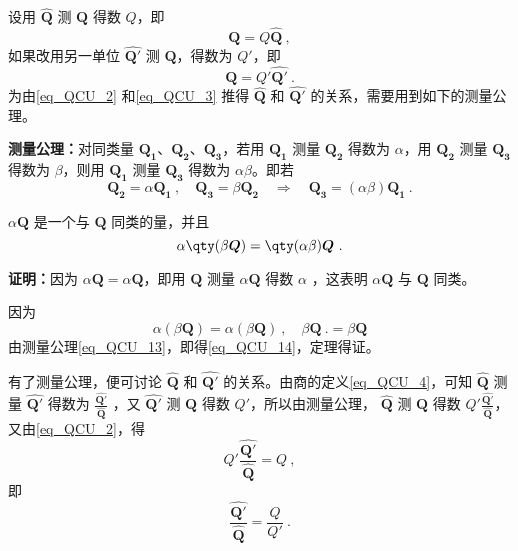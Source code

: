 设用 $\hat{\boldsymbol{Q}}$ 测 $\boldsymbol{Q}$ 得数 $Q$，即
\begin{equation}\label{eq_QCU_2}
\boldsymbol{Q}=Q\hat{\boldsymbol{Q}}~,
\end{equation}
如果改用另一单位 $\hat{\boldsymbol{Q'}}$ 测 $\boldsymbol{Q}$，得数为 $Q'$，即
\begin{equation}\label{eq_QCU_3}
\boldsymbol{Q}=Q'\hat{\boldsymbol{Q'}}~.
\end{equation}
为由\autoref{eq_QCU_2} 和\autoref{eq_QCU_3} 推得 $\hat{\boldsymbol{Q}}$ 和 $\hat{\boldsymbol{Q'}}$ 的关系，需要用到如下的测量公理。

\textbf{测量公理：}对同类量 $\boldsymbol{Q_1}$、$\boldsymbol{Q_2}$、$\boldsymbol{Q_3}$，若用 $\boldsymbol{Q_1}$ 测量 $\boldsymbol{Q_2}$ 得数为 $\alpha$，用 $\boldsymbol{Q_2}$ 测量 $\boldsymbol{Q_3}$ 得数为 $\beta$，则用 $\boldsymbol{Q_1}$ 测量 $\boldsymbol{Q_3}$ 得数为 $\alpha\beta$。即若
\begin{equation}\label{eq_QCU_13}
\boldsymbol{Q_2}=\alpha\boldsymbol{Q_1}~,\quad \boldsymbol{Q_3}=\beta\boldsymbol{Q_2}\quad\Rightarrow \quad\boldsymbol{Q_3}=(\alpha\beta)\boldsymbol{Q_1}~.
\end{equation}

\begin{theorem}{}\label{the_QCU_2}
$\alpha \boldsymbol{Q}$ 是一个与 $\boldsymbol{Q}$ 同类的量，并且
\begin{equation}\label{eq_QCU_14}
\alpha\qty(\beta \boldsymbol{Q})=\qty(\alpha\beta)\boldsymbol Q~.
\end{equation}
\end{theorem}
\textbf{证明：}因为 $\alpha\boldsymbol{Q}=\alpha\boldsymbol{Q}$，即用 $\boldsymbol{Q}$ 测量 $\alpha\boldsymbol{Q}$ 得数 $\alpha$ ，这表明 $\alpha\boldsymbol{Q}$ 与 $\boldsymbol{Q}$ 同类。

因为
\begin{equation}
\alpha(\beta\boldsymbol{Q})=\alpha(\beta\boldsymbol{Q})~,\quad \beta\boldsymbol{Q}~.=\beta\boldsymbol{Q}
\end{equation}
由测量公理\autoref{eq_QCU_13}，即得\autoref{eq_QCU_14}，定理得证。

有了测量公理，便可讨论 $\hat{\boldsymbol{Q}}$ 和 $\hat{\boldsymbol{Q'}}$ 的关系。由商的定义\autoref{eq_QCU_4}，可知 $\hat{\boldsymbol{Q}}$ 测量 $\hat{\boldsymbol{Q'}}$ 得数为 $\frac{\hat{\boldsymbol{Q'}}}{\hat{\boldsymbol{Q}}}$ ，又 $\hat{\boldsymbol{Q'}}$ 测 $\boldsymbol{Q}$ 得数 $Q'$，所以由测量公理， $\hat{\boldsymbol{Q}}$ 测 $\boldsymbol{Q}$ 得数 $Q'\frac{\hat{\boldsymbol{Q'}}}{\hat{\boldsymbol{Q}}}$，又由\autoref{eq_QCU_2}，得
\begin{equation}
Q'\frac{\hat{\boldsymbol{Q'}}}{\hat{\boldsymbol{Q}}}=Q~,
\end{equation}
即
\begin{equation}\label{eq_QCU_8}
\frac{\hat{\boldsymbol{Q'}}}{\hat{\boldsymbol{Q}}}=\frac{Q}{Q'}~.
\end{equation}

